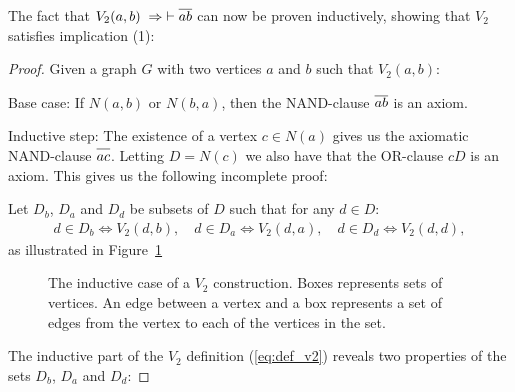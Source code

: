 The fact that $V_2(a,b) \;\Rightarrow\; \vdash \ol{ab}$ can now be proven inductively, showing that $V_2$ satisfies implication (1):
\begin{proof}
  Given a graph $G$ with two vertices $a$ and $b$ such that $V_2(a,b)$:

  Base case:
  If $N(a,b)$ or $N(b,a)$, then the NAND-clause $\ol{ab}$ is an axiom.

  Inductive step:
  The existence of a vertex $c \in N(a)$ gives us the axiomatic NAND-clause $\ol{ac}$.
  Letting $D = N(c)$ we also have that the OR-clause $cD$ is an axiom.
  This gives us the following incomplete proof:\par
  \begin{prooftree*}
    \Hypo{\dots}
  \end{prooftree*}
  Let $D_b$, $D_a$ and $D_d$ be subsets of $D$ such that for any $d \in D$:
  \begin{align}
    d \in D_b \Leftrightarrow V_2(d,b),\quad d \in D_a \Leftrightarrow V_2(d,a),\quad d \in D_d \Leftrightarrow V_2(d,d),
  \end{align}
  as illustrated in Figure~\ref{fig:v2_situation}\par
  \begin{figure}[!h]
    \centering
    \caption{The inductive case of a $V_2$ construction.
    Boxes represents sets of vertices.
    An edge between a vertex and a box represents a set of edges from the vertex to each of the vertices in the set.}
    \label{fig:v2_situation}
  \end{figure}
  \FloatBarrier
  The inductive part of the $V_2$ definition (\ref{eq:def_v2}) reveals two properties of the sets $D_b$, $D_a$ and $D_d$:

\end{proof}
